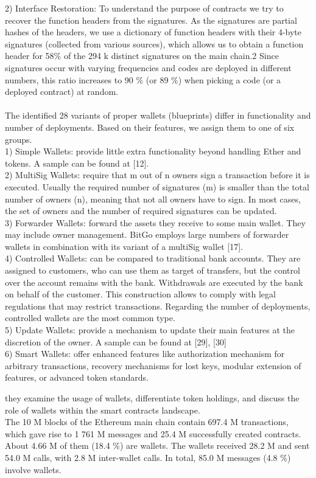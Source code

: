 \documentclass[12pt]{article}
\begin{document}
\par2) Interface Restoration: To understand the purpose of
contracts we try to recover the function headers from the
signatures. As the signatures are partial hashes of the headers,
we use a dictionary of function headers with their 4-byte
signatures (collected from various sources), which allows us to
obtain a function header for 58\% of the 294 k distinct signatures on the main chain.2 Since signatures occur with varying
frequencies and codes are deployed in different numbers, this
ratio increases to 90 \% (or 89 \%) when picking a code (or a
deployed contract) at random.
\\
\\
The identified 28 variants of proper wallets (blueprints)
differ in functionality and number of deployments. Based on
their features, we assign them to one of six groups.\\
1) Simple Wallets: provide little extra functionality beyond
handling Ether and tokens. A sample can be found at [12].\\
2) MultiSig Wallets: require that m out of n owners sign a
transaction before it is executed. Usually the required number
of signatures (m) is smaller than the total number of owners
(n), meaning that not all owners have to sign. In most cases,
the set of owners and the number of required signatures can
be updated.\\
3) Forwarder Wallets: forward the assets they receive to
some main wallet. They may include owner management.
BitGo employs large numbers of forwarder wallets in combination with its variant of a multiSig wallet [17].\\
4) Controlled Wallets: can be compared to traditional bank
accounts. They are assigned to customers, who can use them
as target of transfers, but the control over the account remains
with the bank. Withdrawals are executed by the bank on
behalf of the customer. This construction allows to comply
with legal regulations that may restrict transactions. Regarding
the number of deployments, controlled wallets are the most
common type.\\
5) Update Wallets: provide a mechanism to update their
main features at the discretion of the owner. A sample can be
found at [29], [30]\\
6) Smart Wallets: offer enhanced features like authorization
mechanism for arbitrary transactions, recovery mechanisms for
lost keys, modular extension of features, or advanced token
standards.
\par they examine the usage of wallets, differentiate token holdings, and discuss the role of wallets within the
smart contracts landscape.\\
The 10 M blocks of the Ethereum main chain contain
697.4 M transactions, which gave rise to 1 761 M messages
and 25.4 M successfully created contracts. About 4.66 M of
them (18.4 \%) are wallets. The wallets received 28.2 M and
sent 54.0 M calls, with 2.8 M inter-wallet calls. In total, 85.0 M
messages (4.8 \%) involve wallets.
\end{document}
